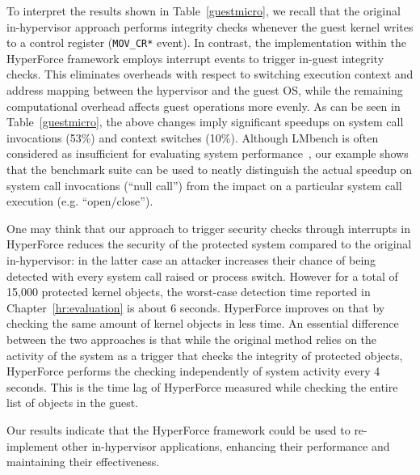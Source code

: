 To interpret the results shown in Table~\ref{guestmicro}, we recall that the original in-hypervisor approach performs integrity checks whenever the guest kernel writes to a control register (\texttt{MOV\_CR*} event). 
%
In contrast, the implementation within the HyperForce framework employs interrupt events to trigger in-guest integrity checks. This eliminates overheads with respect to switching execution context and address mapping between the hypervisor and the guest OS, while the remaining computational overhead affects guest operations more evenly. As can be seen in Table~\ref{guestmicro}, the above changes imply significant speedups on system call invocations (53\%) and context switches (10\%). Although LMbench is often considered as insufficient for evaluating system performance~\cite{lmbenchevil}, our example shows that the benchmark suite can be used to neatly distinguish the actual speedup on system call invocations (\enquote{null call}) from the impact on a particular system call execution (e.g. \enquote{open/close}).

One may think that our approach to trigger security checks through interrupts in HyperForce reduces the security of the protected system compared to the original in-hypervisor: in the latter case an attacker increases their chance of being detected with every system call raised or process switch. However for a total
of 15,000 protected kernel objects, the worst-case detection time reported in Chapter~\ref{hr:evaluation} is about 6 seconds. 
HyperForce improves on that by checking the same amount of kernel objects in less time. 
An essential difference between the two approaches is that while the original method relies on the activity of the system as a trigger that checks the integrity of protected objects, HyperForce performs the checking independently of system activity every 4 seconds. This is the time lag of HyperForce measured while checking the entire list of objects in the guest.  

Our results indicate that the HyperForce framework could be used to re-implement other in-hypervisor applications, enhancing their performance and maintaining their effectiveness.
%

